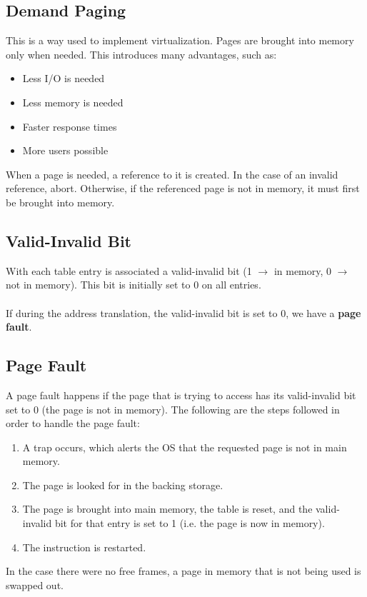 \documentclass{article}
\begin{document}
\subsection{Demand Paging}
This is a way used to implement virtualization. Pages are brought into memory only when needed. This introduces many advantages, such as:

\begin{itemize}
	\item Less I/O is needed
	\item Less memory is needed
	\item Faster response times
	\item More users possible
\end{itemize}
When a page is needed, a reference to it is created. In the case of an invalid reference, abort. Otherwise, if the referenced page is not in memory, it must first be brought into memory.

\subsection{Valid-Invalid Bit}
With each table entry is associated a valid-invalid bit (1 $\rightarrow$ in memory, 0 $\rightarrow$ not in memory). This bit is initially set to 0 on all entries. \\ \\
If during the address translation, the valid-invalid bit is set to 0, we have a \textbf{page fault}.

\subsection{Page Fault}
A page fault happens if the page that is trying to access has its valid-invalid bit set to 0 (the page is not in memory). The following are the steps followed in order to handle the page fault:

\begin{enumerate}
	\item A trap occurs, which alerts the OS that the requested page is not in main memory.
	\item The page is looked for in the backing storage.
	\item The page is brought into main memory, the table is reset, and the valid-invalid bit for that entry is set to 1 (i.e. the page is now in memory).
	\item The instruction is restarted.
\end{enumerate}
In the case there were no free frames, a page in memory that is not being used is swapped out.
\end{document}
